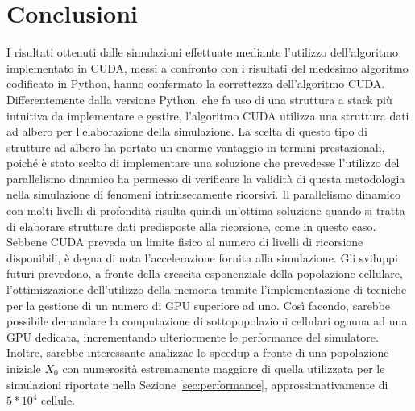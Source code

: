 
\chapter{Conclusioni} %

\label{Conclusioni} %



I risultati ottenuti dalle simulazioni effettuate mediante
l'utilizzo dell'algoritmo implementato in CUDA, messi a confronto con i
risultati del medesimo algoritmo codificato in Python, hanno confermato
la correttezza dell'algoritmo CUDA. Differentemente dalla versione Python, che fa uso di una
struttura a stack più intuitiva da implementare e gestire,
l'algoritmo CUDA utilizza una struttura dati ad albero
per l'elaborazione della simulazione. La scelta di questo tipo di strutture 
ad albero ha portato un enorme
vantaggio in termini prestazionali, poiché è stato scelto di implementare
una soluzione che prevedesse l'utilizzo del parallelismo dinamico ha permesso di
verificare la validità di questa metodologia nella simulazione di fenomeni
intrinsecamente ricorsivi. Il parallelismo dinamico con molti livelli
di profondità risulta quindi un'ottima soluzione quando si tratta di elaborare
strutture dati predisposte alla ricorsione, come in questo caso. Sebbene CUDA
preveda un limite fisico al numero di livelli di ricorsione disponibili, è
degna di nota l'accelerazione fornita alla simulazione.
Gli sviluppi futuri prevedono, a fronte della crescita esponenziale della 
popolazione cellulare, l'ottimizzazione dell'utilizzo della memoria 
tramite l'implementazione di tecniche per la gestione di un numero 
di GPU superiore ad uno. Così facendo, sarebbe possibile demandare la computazione 
di sottopopolazioni cellulari ognuna ad una GPU dedicata, incrementando 
ulteriormente le performance del simulatore. Inoltre, sarebbe interessante 
analizzae lo speedup a fronte di una popolazione iniziale $X_{0}$ con 
numerosità estremamente maggiore di quella utilizzata per le simulazioni 
riportate nella Sezione \ref{sec:performance}, approssimativamente di $5*10^4$
cellule.

